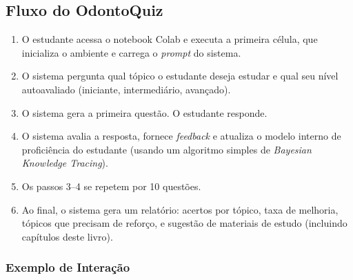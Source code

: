 \subsection{Fluxo do OdontoQuiz}

\begin{enumerate}
  \item O estudante acessa o notebook Colab e executa a primeira célula, que
    inicializa o ambiente e carrega o \textit{prompt} do sistema.

  \item O sistema pergunta qual tópico o estudante deseja estudar e qual seu
    nível autoavaliado (iniciante, intermediário, avançado).

  \item O sistema gera a primeira questão. O estudante responde.

  \item O sistema avalia a resposta, fornece \textit{feedback} e atualiza o
    modelo interno de proficiência do estudante (usando um algoritmo simples
    de \textit{Bayesian Knowledge Tracing}).

  \item Os passos 3--4 se repetem por 10 questões.

  \item Ao final, o sistema gera um relatório: acertos por tópico, taxa de
    melhoria, tópicos que precisam de reforço, e sugestão de materiais de
    estudo (incluindo capítulos deste livro).
\end{enumerate}

\subsubsection{Exemplo de Interação}

